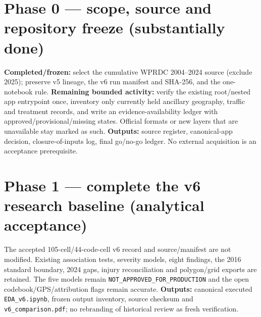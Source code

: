 \documentclass[11pt,a4paper,openany]{report}
\newcommand{\pathcode}[1]{\nolinkurl{#1}}
\begin{document}
\section{Phase 0 --- scope, source and repository freeze (substantially done)}
\textbf{Completed/frozen:} select the cumulative WPRDC 2004--2024 source (exclude 2025); preserve v5 lineage, the v6 run manifest and SHA-256, and the one-notebook rule. \textbf{Remaining bounded activity:} verify the existing root/nested app entrypoint once, inventory only currently held ancillary geography, traffic and treatment records, and write an evidence-availability ledger with approved/provisional/missing states. Official formats or new layers that are unavailable stay marked as such. \textbf{Outputs:} source register, canonical-app decision, closure-of-inputs log, final go/no-go ledger. No external acquisition is an acceptance prerequisite.

\section{Phase 1 --- complete the v6 research baseline (analytical acceptance)}
The accepted 105-cell/44-code-cell v6 record and source/manifest are not modified. Existing association tests, severity models, eight findings, the 2016 standard boundary, 2024 gaps, injury reconciliation and polygon/grid exports are retained. The five models remain \pathcode{NOT_APPROVED_FOR_PRODUCTION} and the open codebook/GPS/attribution flags remain accurate. \textbf{Outputs:} canonical executed \pathcode{EDA_v6.ipynb}, frozen output inventory, source checksum and \pathcode{v6_comparison.pdf}; no rebranding of historical review as fresh verification.
\end{document}
